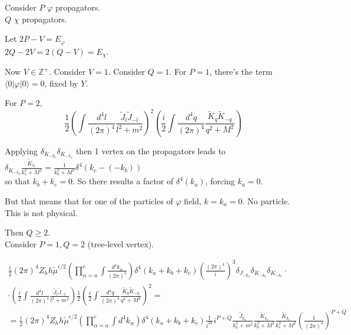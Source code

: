 \documentclass[twoside]{amsart}
\begin{document}
\noindent Consider $P$ $\varphi$ propagators.  \\
\phantom{Consider} $Q$ $\chi$ propagators.  

\noindent Let $2P - V = E_{\varphi}$ \\
\phantom{Let} $2Q - 2V = 2(Q-V) = E_{\chi}$.

Now $V \in \mathbb{Z}^+$.  Consider $V=1$.  Consider $Q=1$.  For $P=1$, there's the term $\langle 0 | \varphi | 0 \rangle =0$, fixed by $Y$.  

For $P=2$,
\[
\frac{1}{2} \left( \int \frac{ d^4l }{ (2\pi)^4} \frac{ \widetilde{J}_l \widetilde{J}_{-l} }{ l^2 + m^2 } \right)^2  \left( \frac{i}{2} \int \frac{ d^4q }{ (2\pi)^4} \frac{ \widetilde{K}_q \widetilde{K}_{-q} }{ q^2 + M^2 } \right) 
\]


Applying $\delta_{K_{-k_b}} \delta_{K_{-k_a}}$ then 1 vertex on the propagators leads to \\
$\delta_{K_{-k_b}} \frac{ \widetilde{K}_{k_c}}{ k_c^2  + M^2 } = \frac{1}{ k_b^2 + M^2 } \delta^4(k_c - (-k_b))$ \\
so that $k_b+k_c =0$.  So there results a factor of $\delta^4(k_a)$, forcing $k_a = 0$.  

But that means that for one of the particles of $\varphi$ field, $k=k_a =0$.  No particle.  This is not physical.  

Then $Q \geq 2$.   \\
Consider $P =1, Q=2$ (tree-level vertex).  

\[
\begin{gathered}
  \frac{i}{2} (2\pi)^4 Z_h h \widetilde{\mu}^{\epsilon/2} \left( \prod_{\alpha = a}^c \int \frac{d^4k_{\alpha}}{ (2\pi)^4} \right) \delta^4(k_a+k_b +k_c)  \left( \frac{ (2\pi)^4}{ i} \right)^3 \delta_{J_{-k_a}} \delta_{K_{-k_b} } \delta_{K_{-k_c}} \cdot \\ 
  \cdot \left( \frac{i}{2} \int \frac{d^4l}{(2\pi)^4} \frac{ \widetilde{J}_l \widetilde{J}_{-l}}{ l^2 + m^2 } \right) \frac{1}{2} \left( \frac{i}{2} \int \frac{d^4q}{ (2\pi)^4} \frac{ \widetilde{K}_q \widetilde{K}_{-q} }{ q^2 + M^2 } \right)^2 = \\
  = \frac{i}{2} (2\pi)^4 Z_h h \widetilde{\mu}^{\epsilon/2} \left( \prod_{\alpha = a}^c \int d^4k_{\alpha} \right) \delta^4(k_a+k_b+k_c) \frac{1}{ i^{3V} } i^{P +Q} \frac{ \widetilde{J}_{k_a}}{ k_a^2  +m^2} \frac{ \widetilde{K}_{k_b}}{ k_b^2  +M^2} \frac{ \widetilde{K}_{k_c}}{ k_c^2  +M^2} \left( \frac{1}{ (2\pi)^4} \right)^{P+Q}
\end{gathered}
\]
\end{document}

